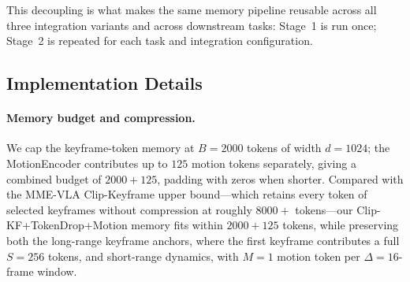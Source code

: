\documentclass{article}
\begin{document}
This decoupling is what makes the same memory pipeline reusable across all
three integration variants and across downstream tasks: Stage~1 is run
once; Stage~2 is repeated for each task and integration configuration.

\subsection{Implementation Details}
\label{sec:impl}


\paragraph{Memory budget and compression.}
We cap the keyframe-token memory at $B\!=\!2000$ tokens of width
$d\!=\!1024$; the MotionEncoder contributes up to $125$ motion tokens
separately, giving a combined budget of $2000{+}125$, padding with zeros
when shorter.  Compared with the MME-VLA Clip-Keyframe upper bound---which retains every
token of selected keyframes without compression at roughly $8000{+}$ tokens---our
Clip-KF+TokenDrop+Motion memory fits within $2000{+}125$ tokens, while
preserving both the long-range keyframe anchors, where the first keyframe
contributes a full $S\!=\!256$ tokens, and short-range dynamics, with
$M\!=\!1$ motion token per $\Delta\!=\!16$-frame window.
\end{document}

